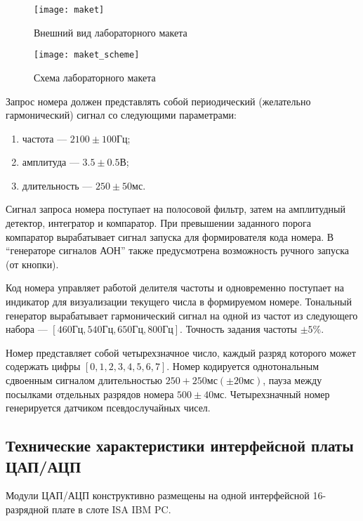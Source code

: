 \begin{figure}[h]%
    \centering
    \texttt{[image: maket]}%
    \caption[]{Внешний вид лабораторного макета}%
    \label{fig:maket}%
\end{figure}
%
\begin{figure}[h]%
    \centering
    \texttt{[image: maket\_scheme]}%
    \caption[]{Схема лабораторного макета}%
    \label{fig:maket_scheme}%
\end{figure}

Запрос номера должен представлять собой периодический (желательно гармонический) сигнал со следующими параметрами:
%
\begin{enumerate}
\item частота --- $2100 \pm 100 \text{Гц}$;
\item амплитуда --- $3.5 \pm 0.5 \text{В}$;
\item длительность --- $250 \pm 50 \text{мс}$.
\end{enumerate}

Сигнал запроса номера поступает на полосовой фильтр, затем на амплитудный детектор, интегратор и компаратор. При превышении заданного порога компаратор вырабатывает сигнал запуска для формирователя кода номера. В \enquote{генераторе сигналов АОН} также предусмотрена возможность ручного запуска (от кнопки).

Код номера управляет работой делителя частоты и одновременно поступает на индикатор для визуализации текущего числа в формируемом номере. Тональный генератор вырабатывает гармонический сигнал на одной из частот из следующего набора — $[460\text{Гц}, 540\text{Гц}, 650\text{Гц}, 800\text{Гц}]$. Точность задания частоты $\pm 5\%$.

Номер представляет собой четырехзначное число, каждый разряд которого может содержать цифры $[0, 1, 2, 3, 4, 5, 6, 7]$. Номер кодируется однотональным сдвоенным сигналом длительностью $250 + 250 \text{мс} (\pm 20 \text{мс})$, пауза между посылками отдельных разрядов номера $500 \pm 40 \text{мс}$. Четырехзначный номер генерируется датчиком псевдослучайных чисел.

\subsection{Технические характеристики интерфейсной платы ЦАП/АЦП}

Модули ЦАП/АЦП конструктивно размещены на одной интерфейсной 16-разрядной плате в слоте ISA IBM PC.

